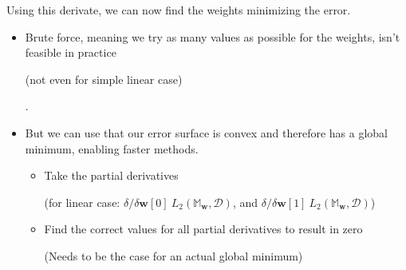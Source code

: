 Using this derivate, we can now find the weights minimizing the error. 
\begin{itemize}
  \item Brute force, meaning we try as many values as possible for the weights, isn't feasible in practice \begin{note}(not even for simple linear case)\end{note}.
  \item But we can use that our error surface is convex and therefore has a global minimum, enabling faster methods.
  \begin{itemize}
    \item Take the partial derivatives \begin{note}(for linear case: $\delta / \delta \mathbf{w}[0] \ L_2(\mathbb{M}_\mathbf{w}, \mathcal{D})$, and $\delta / \delta \mathbf{w}[1] \ L_2(\mathbb{M}_\mathbf{w}, \mathcal{D})$)\end{note}
    \item Find the correct values for all partial derivatives to result in zero \begin{note}(Needs to be the case for an actual global minimum)\end{note}
  \end{itemize}
\end{itemize}

